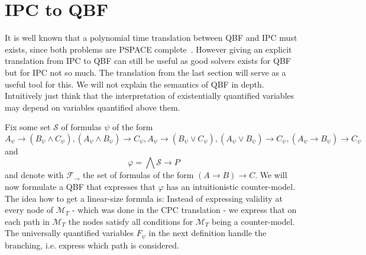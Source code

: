 \documentclass[a4paper,12pt]{report}
\theoremstyle{definition}
\theoremstyle{definition}
\theoremstyle{definition}
\theoremstyle{definition}
\theoremstyle{definition}
\theoremstyle{definition}
\theoremstyle{definition}
\begin{document}
	\section{IPC to QBF}
	
	It is well known that a polynomial time translation between QBF and IPC must exists, since both problems are PSPACE complete~\cite{garey1979computers, statman1979intuitionistic}. However giving an explicit translation from IPC to QBF can still be useful as good solvers exists for QBF but for IPC not so much. The translation from the last section will serve as a useful tool for this. We will not explain the semantics of QBF in depth. Intuitively just think that the interpretation of existentially quantified variables may depend on variables quantified above them.
	
	Fix some set $\mathcal S$ of formulas $\psi$ of the form $$A_\psi\to (B_\psi\wedge C_\psi), (A_\psi\wedge B_\psi)\to C_\psi, A_\psi\to (B_\psi\vee C_\psi), (A_\psi\vee B_\psi)\to C_\psi, (A_\psi\to B_\psi)\to C_\psi$$and$$\varphi = \bigwedge \mathcal S\to P$$
	and denote with $\mathcal F_\to$ the set of formulas of the form $(A\to B)\to C$. We will now formulate a QBF that expresses that $\varphi$ has an intuitionistic counter-model. The idea how to get a linear-size formula is: Instead of expressing validity at every node of $\mathcal M_T$ - which was done in the CPC translation - we express that on each path in $\mathcal M_T$ the nodes satisfy all conditions for $\mathcal M_T$ being a counter-model. The universally quantified variables $F_\psi$ in the next definition handle the branching, i.e. express which path is considered.
	
\end{document}
